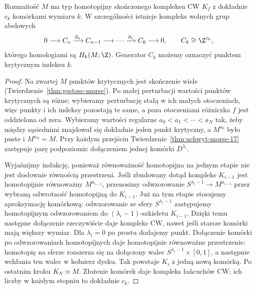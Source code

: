 \begin{twierdzenie}
\label{thm:cw-morse-17}
Rozmaitość $M$ ma typ homotopijny
skończonego kompleksu CW $K_f$
z dokładnie $c_k$ komórkami
wymiaru $k$. W szczególności
istnieje kompleks wolnych grup
abelowych
\[
 0\longrightarrow C_n
 \xrightarrow{\partial_n}C_{n-1}
 \longrightarrow\cdots
 \xrightarrow{\partial_1}C_0
 \longrightarrow0,\qquad
 C_k\cong\Z^{c_k},
\]
którego homologiami są $H_k(M;\Z)$.
Generator $C_k$ możemy oznaczyć
punktem krytycznym indeksu $k$.
\end{twierdzenie}
\begin{proof}
Na zwartej $M$ punktów krytycznych
jest skończenie wiele
(Twierdzenie~\ref{thm:gestosc-morse}).
Po małej perturbacji wartości
punktów krytycznych są różne;
wybieramy perturbację stałą
w ich małych otoczeniach,
więc punkty i ich indeksy
pozostają te same, a poza
otoczeniami różniczka $f$
jest oddzielona od zera.
Wybieramy wartości
regularne
$a_0<a_1<\cdots<a_N$
tak, żeby między sąsiednimi
znajdował się dokładnie jeden
punkt krytyczny, a $M^{a_0}$
było puste i $M^{a_N}=M$.
Przy każdym przejściu
Twierdzenie~\ref{thm:uchwyt-morse-17}
zastępuje parę podpoziomic
dołączeniem jednej komórki
$D^{\lambda_i}$.

Wyjaśnijmy indukcję, ponieważ
równoważność homotopijna na
jednym etapie nie jest dosłownie
równością przestrzeni.
Jeśli zbudowany dotąd kompleks
$K_{i-1}$ jest homotopijnie
równoważny $M^{a_{i-1}}$,
przenosimy odwzorowanie
$S^{\lambda_i-1}\to M^{a_{i-1}}$
przez wybraną odwrotność
homotopijną do $K_{i-1}$.
Już na tym etapie stosujemy aproksymację komórkową:
odwzorowanie ze sfery $S^{\lambda_i-1}$ zastępujemy homotopijnym
odwzorowaniem do $(\lambda_i-1)$-szkieletu $K_{i-1}$.
Dzięki temu następne dołączenie rzeczywiście daje
kompleks CW, nawet jeśli starsze komórki mają większy wymiar.
Dla $\lambda_i=0$ po prostu dodajemy punkt.
Dołączenie komórki po odwzorowaniach
homotopijnych daje
homotopijnie równoważne
przestrzenie: homotopię
na sferze rozszerza się
na dołączony walec
$S^{\lambda_i-1}\times[0,1]$,
a następnie wchłania ten
walec w kołnierz dysku.
Tak powstaje $K_i$ z jedną
nową komórką.
Po ostatnim kroku
$K_N\simeq M$.
Złożenie komórek daje
kompleks łańcuchów CW;
ich liczby w każdym stopniu
to dokładnie $c_k$.
\end{proof}

